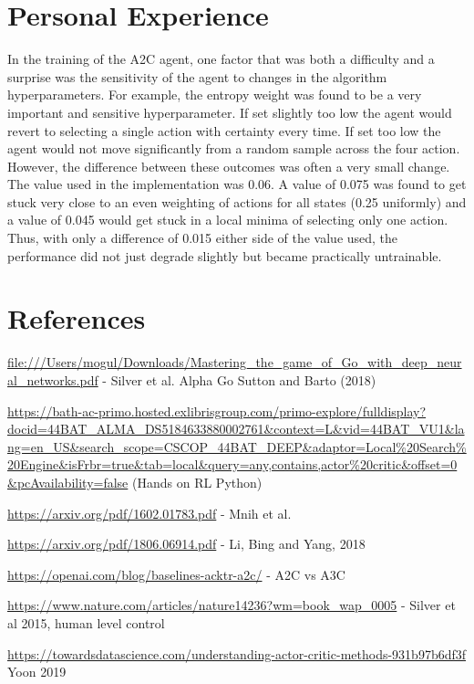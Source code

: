 \documentclass{article}
\begin{document}
\section{Personal Experience}

In the training of the A2C agent, one factor that was both a difficulty and a surprise was the sensitivity of the agent to changes in the algorithm hyperparameters. For example, the entropy weight was found to be a very important and sensitive hyperparameter. If set slightly too low the agent would revert to selecting a single action with certainty every time. If set too low the agent would not move significantly from a random sample across the four action. However, the difference between these outcomes was often a very small change. The value used in the implementation was 0.06. A value of 0.075 was found to get stuck very close to an even weighting of actions for all states (0.25 uniformly) and a value of 0.045 would get stuck in a local minima of selecting only one action. Thus, with only a difference of 0.015 either side of the value used, the performance did not just degrade slightly but became practically untrainable.

\section*{References}


\url{file:///Users/mogul/Downloads/Mastering_the_game_of_Go_with_deep_neural_networks.pdf} - Silver et al. Alpha Go
Sutton and Barto (2018)

\url{https://bath-ac-primo.hosted.exlibrisgroup.com/primo-explore/fulldisplay?docid=44BAT_ALMA_DS5184633880002761&context=L&vid=44BAT_VU1&lang=en_US&search_scope=CSCOP_44BAT_DEEP&adaptor=Local%20Search%20Engine&isFrbr=true&tab=local&query=any,contains,actor%20critic&offset=0&pcAvailability=false} (Hands on RL Python)

\url{https://arxiv.org/pdf/1602.01783.pdf} - Mnih et al.

\url{https://arxiv.org/pdf/1806.06914.pdf} - Li, Bing and Yang, 2018

\url{https://openai.com/blog/baselines-acktr-a2c/} - A2C vs A3C

\url{https://www.nature.com/articles/nature14236?wm=book_wap_0005} - Silver et al 2015, human level control

\url{https://towardsdatascience.com/understanding-actor-critic-methods-931b97b6df3f} Yoon 2019
\end{document}
